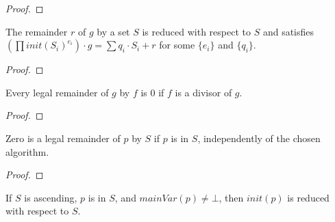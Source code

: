 \begin{proof}
    \leanok
\end{proof}

\begin{theorem}
    \label{thm:setPseudo_remainder_isSetRemainder}
    \leanok
    The remainder $r$ of $g$ by a set $S$ is reduced with respect to $S$ and
    satisfies $(\prod init(S_i)^{e_i}) \cdot g = \sum q_i \cdot S_i + r$ for some $\{e_i\}$ and $\{q_i\}$.
\end{theorem}

\begin{proof}
    \leanok
\end{proof}

\begin{theorem}
    \label{thm:pseudo_remainder_eq_zero_of_dvd}
    \leanok
    Every legal remainder of $g$ by $f$ is $0$ if $f$ is a divisor of $g$.
\end{theorem}

\begin{proof}
    \leanok
\end{proof}

\begin{theorem}
    \label{thm:setPseudo_remainder_eq_zero_of_mem}
    \leanok
    Zero is a legal remainder of $p$ by $S$ if $p$ is in $S$, independently of the chosen algorithm.
\end{theorem}

\begin{proof}
    \leanok
\end{proof}

\begin{theorem}
    \label{thm:initial_reducedToSet_of_max_vars_ne_bot}
    \leanok
    If $S$ is ascending, $p$ is in $S$, and $mainVar(p) \neq \bot$, then $init(p)$ is reduced with respect to $S$.
\end{theorem}

